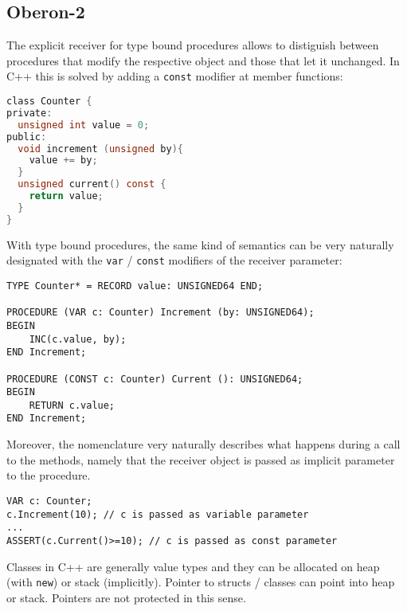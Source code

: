 \documentclass[a4wide,11pt]{article}
\begin{document}
\begin{annotation}
\subsection{Oberon-2}

The explicit receiver for type bound procedures allows to distiguish between procedures that modify the respective object and those that let it unchanged. In C++ this is solved by adding a \lstinline"const" modifier at member functions:
\begin{lstlisting}[style=example,language=C]
class Counter {
private:
  unsigned int value = 0;
public:
  void increment (unsigned by){
    value += by;
  }
  unsigned current() const {
    return value;
  }
}
\end{lstlisting}

With type bound procedures, the same kind of semantics can be very naturally designated with the \lstinline"var" / \lstinline"const" modifiers of the receiver parameter:
\begin{lstlisting}[style=example]
TYPE Counter* = RECORD value: UNSIGNED64 END;

PROCEDURE (VAR c: Counter) Increment (by: UNSIGNED64);
BEGIN
	INC(c.value, by);
END Increment;

PROCEDURE (CONST c: Counter) Current (): UNSIGNED64;
BEGIN
	RETURN c.value;
END Increment;

\end{lstlisting}

Moreover, the nomenclature very naturally describes what happens during a call to the methods, namely that the receiver object is passed as implicit parameter to the procedure.
\begin{lstlisting}[style=example]
VAR c: Counter;
c.Increment(10); // c is passed as variable parameter
...
ASSERT(c.Current()>=10); // c is passed as const parameter
\end{lstlisting}

Classes in C++ are generally value types and they can be allocated on heap (with \lstinline"new") or stack (implicitly).
Pointer to structs / classes can point into heap or stack.
Pointers are not protected in this sense.


\end{annotation}
\end{document}
